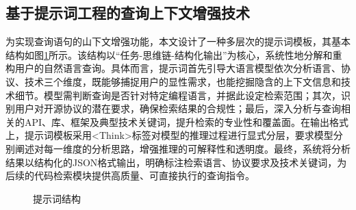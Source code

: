 \documentclass[UTF8,a4paper,12pt]{ctexart}
\numberwithin{equation}{section}
\begin{document}
\subsection{基于提示词工程的查询上下文增强技术}
为实现查询语句的山下文增强功能，本文设计了一种多层次的提示词模板，其基本结构如图\ref{prompt1}所示。该结构以“任务-思维链-结构化输出”为核心，系统性地分解和重构用户的自然语言查询。具体而言，提示词首先引导大语言模型依次分析语言、协议、技术三个维度，既能够捕捉用户的显性需求，也能挖掘隐含的上下文信息和技术细节。模型需判断查询是否针对特定编程语言，并据此设定检索范围；其次，识别用户对开源协议的潜在要求，确保检索结果的合规性；最后，深入分析与查询相关的API、库、框架及典型技术关键词，提升检索的专业性和覆盖面。在输出格式上，提示词模板采用<Think>标签对模型的推理过程进行显式分层，要求模型分别阐述对每一维度的分析思路，增强推理的可解释性和透明度。最终，系统将分析结果以结构化的JSON格式输出，明确标注检索语言、协议要求及技术关键词，为后续的代码检索模块提供高质量、可直接执行的查询指令。\par
\begin{figure}[H]
	\caption{提示词结构}
	\label{prompt1}
\end{figure}
\end{document}
